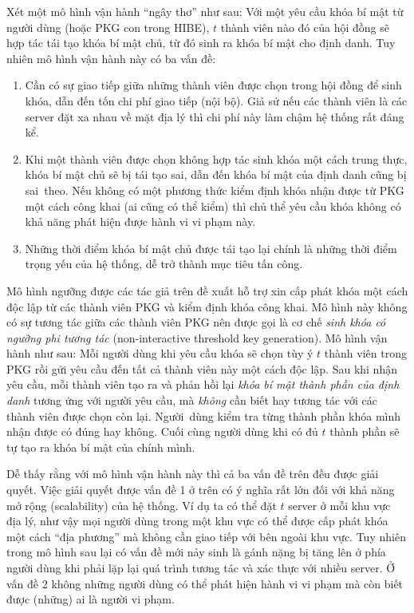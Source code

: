 \documentclass[class=report, crop=false]{standalone}
\begin{document}
			Xét một mô hình vận hành ``ngây thơ'' như sau: Với một yêu cầu khóa bí mật từ người dùng (hoặc PKG con trong HIBE), $t$ thành viên nào đó của hội đồng sẽ hợp tác tái tạo khóa bí mật chủ, từ đó sinh ra khóa bí mật cho định danh. Tuy nhiên mô hình vận hành này có ba vấn đề:
			\vspace{-0.5cm}
			\begin{enumerate}
				\item Cần có sự giao tiếp giữa những thành viên được chọn trong hội đồng để sinh khóa, dẫn đến tốn chi phí giao tiếp (nội bộ). Giả sử nếu các thành viên là các server đặt xa nhau về mặt địa lý thì chi phí này làm chậm hệ thống rất đáng kể.
				\item Khi một thành viên được chọn không hợp tác sinh khóa một cách trung thực, khóa bí mật chủ sẽ bị tái tạo sai, dẫn đến khóa bí mật của định danh cũng bị sai~theo. Nếu không có một phương thức kiểm định khóa nhận được từ PKG một cách công khai (ai cũng có thể kiểm) thì chủ thể yêu cầu khóa không có khả năng phát hiện được hành vi vi phạm này.
				\item Những thời điểm khóa bí mật chủ được tái tạo lại chính là những thời điểm trọng yếu của hệ thống, dễ trở thành mục tiêu tấn công.
			\end{enumerate}
			
			Mô hình ngưỡng được các tác giả trên đề xuất hỗ trợ xin cấp phát khóa một cách độc lập từ các thành viên PKG và kiểm định khóa công khai. Mô hình này không có sự tương tác giữa các thành viên PKG nên được gọi là cơ chế \textit{sinh khóa có ngưỡng phi tương tác} (non-interactive threshold key generation). Mô hình vận hành như sau: Mỗi người dùng khi yêu cầu khóa sẽ chọn tùy ý $t$ thành viên trong PKG rồi gửi yêu cầu đến tất cả thành viên này một cách độc lập. Sau khi nhận yêu cầu, mỗi thành viên tạo ra và phản hồi lại \textit{khóa bí mật thành phần của định danh} tương ứng với người yêu cầu, mà \emph{không} cần biết hay tương tác với các thành viên được chọn còn lại. Người~dùng kiểm tra từng thành phần khóa mình nhận được có đúng hay không. Cuối cùng người dùng khi có đủ $t$ thành phần sẽ tự tạo ra khóa bí mật của chính mình.
			
			Dễ thấy rằng với mô hình vận hành này thì cả ba vấn đề trên đều được giải quyết. Việc giải quyết được vấn đề 1 ở trên có ý nghĩa rất lớn đối với khả năng mở rộng (scalability) của hệ thống. Ví dụ ta có thể đặt $t$ server ở mỗi khu vực địa lý, như vậy mọi người dùng trong một khu vực có thể được cấp phát khóa một cách ``địa phương'' mà không cần giao tiếp với bên ngoài khu vực. Tuy nhiên trong mô hình sau lại có vấn đề mới nảy sinh là gánh nặng bị tăng lên ở phía người dùng khi phải lặp lại quá trình tương tác và xác thực với nhiều server. Ở vấn đề 2 không những người dùng có thể phát hiện hành vi vi phạm mà còn biết được (những) ai là người vi phạm.
\end{document}

